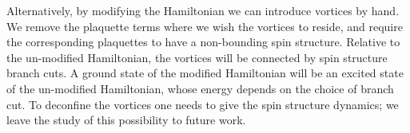 
Alternatively, by modifying the Hamiltonian we can introduce vortices by hand. 
We remove the plaquette terms where we wish the vortices to reside, 
and require the corresponding plaquettes to have a non-bounding spin structure.
Relative to the un-modified Hamiltonian, 
the vortices will be connected by spin structure branch cuts.
A ground state of the modified Hamiltonian will be an excited state of the un-modified Hamiltonian, 
whose energy depends on the choice of branch cut.
To deconfine the vortices one needs to give the spin structure dynamics; 
we leave the study of this possibility to future work.

